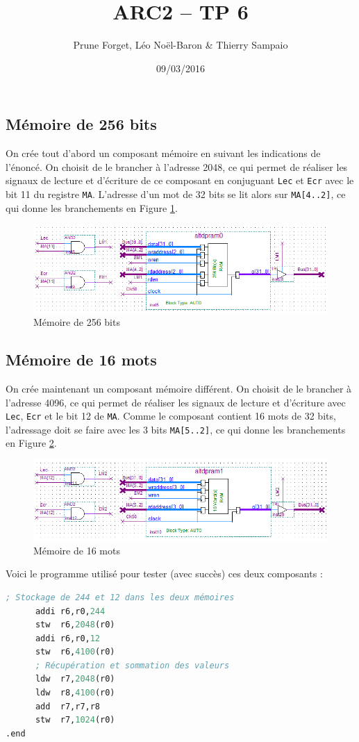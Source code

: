 \documentclass[a4paper,11pt]{article}
\title{ARC2 -- TP 6}
\author{Prune Forget, Léo Noël-Baron \& Thierry Sampaio}
\date{09/03/2016}
\begin{document}
\maketitle

\subsection*{Mémoire de 256 bits}

On crée tout d'abord un composant mémoire en suivant les indications de l'énoncé. On choisit de le brancher à l'adresse 2048, ce qui permet de réaliser les signaux de lecture et d'écriture de ce composant en conjuguant \verb?Lec? et \verb?Ecr? avec le bit 11 du registre \verb?MA?. L'adresse d'un mot de 32 bits se lit alors sur \verb?MA[4..2]?, ce qui donne les branchements en Figure \ref{membits}.

\begin{figure}[h]\center
\includegraphics[scale=0.7]{tp6-1.PNG}
\caption{Mémoire de 256 bits}
\label{membits}
\end{figure}

\subsection*{Mémoire de 16 mots}

On crée maintenant un composant mémoire différent. On choisit de le brancher à l'adresse 4096, ce qui permet de réaliser les signaux de lecture et d'écriture avec \verb?Lec?, \verb?Ecr? et le bit 12 de \verb?MA?. Comme le composant contient 16 mots de 32 bits, l'adressage doit se faire avec les 3 bits \verb?MA[5..2]?, ce qui donne les branchements en Figure \ref{memwords}.

\begin{figure}[h]\center
\includegraphics[scale=0.7]{tp6-2.PNG}
\caption{Mémoire de 16 mots}
\label{memwords}
\end{figure}

Voici le programme utilisé pour tester (avec succès) ces deux composants :
\begin{lstlisting}[language=Lisp]
      ; Stockage de 244 et 12 dans les deux mémoires
      addi r6,r0,244
      stw  r6,2048(r0)
      addi r6,r0,12
      stw  r6,4100(r0)
      ; Récupération et sommation des valeurs
      ldw  r7,2048(r0)
      ldw  r8,4100(r0)
      add  r7,r7,r8
      stw  r7,1024(r0)
.end
\end{lstlisting}
\end{document}
